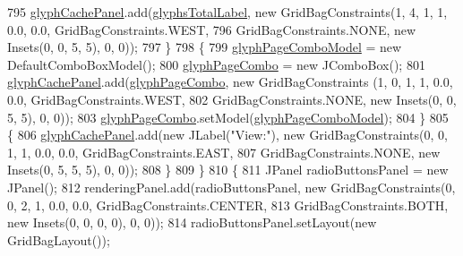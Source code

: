 \begin{DoxyCode}
795                     \mbox{\hyperlink{classorg_1_1newdawn_1_1slick_1_1tools_1_1hiero_1_1_hiero_a2a248f40f119ae31da5353e42be42662}{glyphCachePanel}}.add(\mbox{\hyperlink{classorg_1_1newdawn_1_1slick_1_1tools_1_1hiero_1_1_hiero_a146359fd9b8ca84fe0282bf5958fc02e}{glyphsTotalLabel}}, \textcolor{keyword}{new} 
      GridBagConstraints(1, 4, 1, 1, 0.0, 0.0, GridBagConstraints.WEST,
796                         GridBagConstraints.NONE, \textcolor{keyword}{new} Insets(0, 0, 5, 5), 0, 0));
797                 \}
798                 \{
799                     \mbox{\hyperlink{classorg_1_1newdawn_1_1slick_1_1tools_1_1hiero_1_1_hiero_a8c372704d7cad96c8bfb7254bbbf9fe4}{glyphPageComboModel}} = \textcolor{keyword}{new} DefaultComboBoxModel();
800                     \mbox{\hyperlink{classorg_1_1newdawn_1_1slick_1_1tools_1_1hiero_1_1_hiero_aa84207124776d8dd13b7a97ad00bb7c3}{glyphPageCombo}} = \textcolor{keyword}{new} JComboBox();
801                     \mbox{\hyperlink{classorg_1_1newdawn_1_1slick_1_1tools_1_1hiero_1_1_hiero_a2a248f40f119ae31da5353e42be42662}{glyphCachePanel}}.add(\mbox{\hyperlink{classorg_1_1newdawn_1_1slick_1_1tools_1_1hiero_1_1_hiero_aa84207124776d8dd13b7a97ad00bb7c3}{glyphPageCombo}}, \textcolor{keyword}{new} GridBagConstraints
      (1, 0, 1, 1, 0.0, 0.0, GridBagConstraints.WEST,
802                         GridBagConstraints.NONE, \textcolor{keyword}{new} Insets(0, 0, 5, 5), 0, 0));
803                     \mbox{\hyperlink{classorg_1_1newdawn_1_1slick_1_1tools_1_1hiero_1_1_hiero_aa84207124776d8dd13b7a97ad00bb7c3}{glyphPageCombo}}.setModel(\mbox{\hyperlink{classorg_1_1newdawn_1_1slick_1_1tools_1_1hiero_1_1_hiero_a8c372704d7cad96c8bfb7254bbbf9fe4}{glyphPageComboModel}});
804                 \}
805                 \{
806                     \mbox{\hyperlink{classorg_1_1newdawn_1_1slick_1_1tools_1_1hiero_1_1_hiero_a2a248f40f119ae31da5353e42be42662}{glyphCachePanel}}.add(\textcolor{keyword}{new} JLabel(\textcolor{stringliteral}{"View:"}), \textcolor{keyword}{new} GridBagConstraints(0, 0, 1,
       1, 0.0, 0.0, GridBagConstraints.EAST,
807                         GridBagConstraints.NONE, \textcolor{keyword}{new} Insets(0, 5, 5, 5), 0, 0));
808                 \}
809             \}
810             \{
811                 JPanel radioButtonsPanel = \textcolor{keyword}{new} JPanel();
812                 renderingPanel.add(radioButtonsPanel, \textcolor{keyword}{new} GridBagConstraints(0, 0, 2, 1, 0.0, 0.0, 
      GridBagConstraints.CENTER,
813                     GridBagConstraints.BOTH, \textcolor{keyword}{new} Insets(0, 0, 0, 0), 0, 0));
814                 radioButtonsPanel.setLayout(\textcolor{keyword}{new} GridBagLayout());

\end{DoxyCode}
